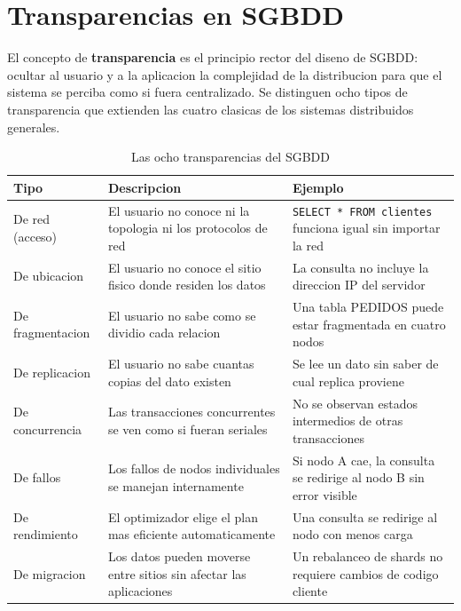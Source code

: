 \documentclass[11pt,a4paper]{article}
\begin{document}
\section{Transparencias en SGBDD}

El concepto de \textbf{transparencia} es el principio rector del diseno de SGBDD: ocultar al usuario y a la aplicacion la complejidad de la distribucion para que el sistema se perciba como si fuera centralizado. Se distinguen ocho tipos de transparencia que extienden las cuatro clasicas de los sistemas distribuidos generales.

\begin{table}[H]
\centering
\caption{Las ocho transparencias del SGBDD}
\footnotesize
\renewcommand{\arraystretch}{1.25}
\begin{tabularx}{\textwidth}{lXX}
\toprule
\textbf{Tipo} & \textbf{Descripcion} & \textbf{Ejemplo} \\
\midrule
De red (acceso) & El usuario no conoce ni la topologia ni los protocolos de red & \texttt{SELECT * FROM clientes} funciona igual sin importar la red \\
De ubicacion & El usuario no conoce el sitio fisico donde residen los datos & La consulta no incluye la direccion IP del servidor \\
De fragmentacion & El usuario no sabe como se dividio cada relacion & Una tabla PEDIDOS puede estar fragmentada en cuatro nodos \\
De replicacion & El usuario no sabe cuantas copias del dato existen & Se lee un dato sin saber de cual replica proviene \\
De concurrencia & Las transacciones concurrentes se ven como si fueran seriales & No se observan estados intermedios de otras transacciones \\
De fallos & Los fallos de nodos individuales se manejan internamente & Si nodo A cae, la consulta se redirige al nodo B sin error visible \\
De rendimiento & El optimizador elige el plan mas eficiente automaticamente & Una consulta se redirige al nodo con menos carga \\
De migracion & Los datos pueden moverse entre sitios sin afectar las aplicaciones & Un rebalanceo de shards no requiere cambios de codigo cliente \\
\bottomrule
\end{tabularx}
\label{tab:transparencias}
\end{table}
\end{document}
